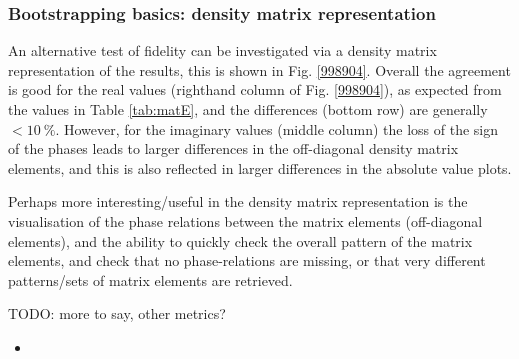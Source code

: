 \subsubsection{Bootstrapping basics: density matrix representation}

An alternative test of fidelity can be investigated via a density matrix representation of the results, this is shown in Fig. \ref{998904}. Overall the agreement is good for the real values (righthand column of Fig. \ref{998904}), as expected from the values in Table \ref{tab:matE}, and the differences (bottom row) are generally $<10~\%$. However, for the imaginary values (middle column) the loss of the sign of the phases leads to larger differences in the off-diagonal density matrix elements, and this is also reflected in larger differences in the absolute value plots.

Perhaps more interesting/useful in the density matrix representation is the visualisation of the phase relations between the matrix elements (off-diagonal elements), and the ability to quickly check the overall pattern of the matrix elements, and check that no phase-relations are missing, or that very different patterns/sets of matrix elements are retrieved.

TODO: more to say, other metrics?


\begin{itemize}
\item 
\end{itemize}